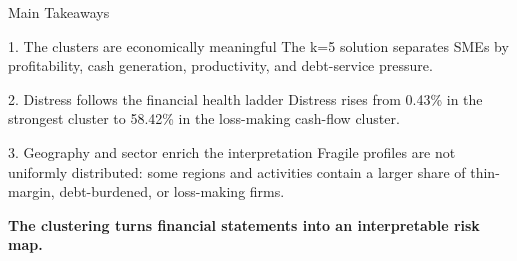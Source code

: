 \documentclass[aspectratio=169,10pt]{beamer}
\newcommand{\pct}[1]{#1\%}
\begin{document}
\begin{frame}{Main Takeaways}
  \begin{block}{1. The clusters are economically meaningful}
    The k=5 solution separates SMEs by profitability, cash generation,
    productivity, and debt-service pressure.
  \end{block}

  \begin{block}{2. Distress follows the financial health ladder}
    Distress rises from \pct{0.43} in the strongest cluster to \pct{58.42} in
    the loss-making cash-flow cluster.
  \end{block}

  \begin{block}{3. Geography and sector enrich the interpretation}
    Fragile profiles are not uniformly distributed: some regions and activities
    contain a larger share of thin-margin, debt-burdened, or loss-making firms.
  \end{block}

  \vspace{0.15cm}
  \centering
  \Large \textbf{The clustering turns financial statements into an interpretable risk map.}
\end{frame}
\end{document}
